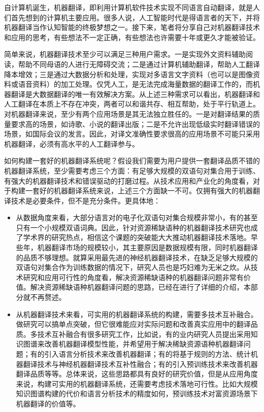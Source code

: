 \begin{spacing}{1.18}


\parinterval 自计算机诞生，机器翻译，即利用计算机软件技术实现不同语言自动翻译，就是人们首先想到的计算机主要应用。很多人说，人工智能时代是得语言者的天下，并将机器翻译当作认知智能的终极梦想之一。接下来，笔者将分享自己对机器翻译技术和应用的思考，有些想法不一定正确，有些想法也许需要十年或更久才能被验证。

\parinterval 简单来说，机器翻译技术至少可以满足三种用户需求。一是实现外文资料辅助阅读，帮助不同母语的人进行无障碍交流；二是通过计算机辅助翻译，帮助人工翻译降本增效；三是通过大数据分析和处理，实现对多语言文字资料（也可以是图像资料或语音资料）的加工处理。仅凭人工，是无法完成海量数据的翻译工作的，而机器翻译是大数据翻译的唯一有效解决方案。从上述三种需求可以看出，机器翻译和人工翻译在本质上不存在冲突，两者可以和谐共存、相互帮助，处于平行轨道上。对机器翻译来说，至少有两个应用场景是其无法独立胜任的。一是对翻译结果的质量要求高的场景，如诗歌、小说的翻译出版；二是不允许出现低级实时翻译错误的场景，如国际会议的发言。因此，对译文准确性要求很高的应用场景不可能只采用机器翻译，必须有高水平的人工翻译参与。

\parinterval 如何构建一套好的机器翻译系统呢？假设我们需要为用户提供一套翻译品质不错的机器翻译系统，至少需要考虑三个方面：有足够大规模的双语句对集合用于训练、有强大的机器翻译技术和错误驱动的打磨过程。从技术应用和产业化的角度看，对于构建一套好的机器翻译系统来说，上述三个方面缺一不可。仅拥有强大的机器翻译技术是必要条件，但不是充分条件。更具体地：
\begin{itemize}
\item 从数据角度来看，大部分语言对的电子化双语句对集合规模非常小，有的甚至只有一个小规模双语词典。因此，针对资源稀缺语种的机器翻译技术研究也成了学术界的研究热点，相信这个课题的突破能大大推动机器翻译技术落地。早些年，机器翻译市场的规模较小，其主要原因是数据规模有限，同时机器翻译的品质不够理想。就算采用最先进的神经机器翻译技术，在缺乏足够大规模的双语句对集合作为训练数据的情况下，研究人员也是巧妇难为无米之炊。从技术研究和应用可行性的角度看，解决资源稀缺语种的机器翻译问题非常有价值。解决资源稀缺语种机器翻译问题的思路，已经在{\chaptersixteen}进行了详细的介绍，本部分就不再赘述。

\item 从机器翻译技术来看，可实用的机器翻译系统的构建，需要多技术互补融合。做研究可以搞单点突破，但它很难能应对实际问题和改善真实应用中的翻译品质。多技术互补融合有很多研究工作，比如说，有的业内研究人员提出采用知识图谱来改善机器翻译模型性能，并希望用于解决稀缺资源语种机器翻译问题；有的引入语言分析技术来改善机器翻译；有的将基于规则的方法、统计机器翻译技术与神经机器翻译技术互补性融合；有的引入预训练技术来改善机器翻译品质等等。总体来说，这些思路都具有良好的研究价值，但是从应用角度来说，构建可实用的机器翻译系统，还需要考虑技术落地可行性。比如大规模知识图谱构建的代价和语言分析技术的精度如何，预训练技术对富资源场景下机器翻译的价值等。


\end{itemize}
\end{spacing}
